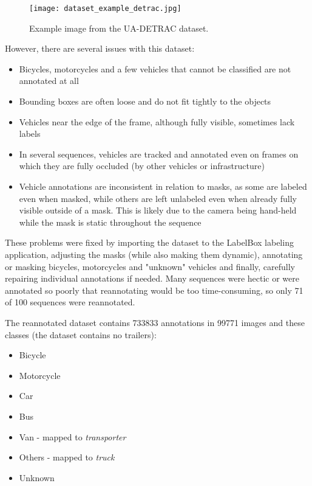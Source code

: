 \begin{figure}[h]
    \centering
    \texttt{[image: dataset\_example\_detrac.jpg]}
    \caption{Example image from the UA-DETRAC dataset.}
    \label{DetracDatasetExample}
\end{figure}

However, there are several issues with this dataset:
\begin{itemize}
    \item Bicycles, motorcycles and a few vehicles that cannot be classified are
    not annotated at all
    \item Bounding boxes are often loose and do not fit tightly to the objects
    \item Vehicles near the edge of the frame, although fully visible,
    sometimes lack labels
    \item In several sequences, vehicles are tracked and annotated even on
    frames on which they are fully occluded (by other vehicles or infrastructure)
    \item Vehicle annotations are inconsistent in relation to masks, as some are
    labeled even when masked, while others are left unlabeled even when already
    fully visible outside of a mask. This is likely due to the camera being
    hand-held while the mask is static throughout the sequence
\end{itemize}

These problems were fixed by importing the dataset to the LabelBox labeling
application, adjusting the masks (while also making them dynamic), annotating or
masking bicycles, motorcycles and "unknown" vehicles and finally, carefully
repairing individual annotations if needed. Many sequences were hectic or were
annotated so poorly that reannotating would be too time-consuming, so only 71 of
100 sequences were reannotated.

The reannotated dataset contains \num{733833} annotations in \num{99771}
images and these classes (the dataset contains no trailers):
\begin{itemize}
    \item Bicycle
    \item Motorcycle
    \item Car
    \item Bus
    \item Van - mapped to \textit{transporter}
    \item Others - mapped to \textit{truck}
    \item Unknown
\end{itemize}


